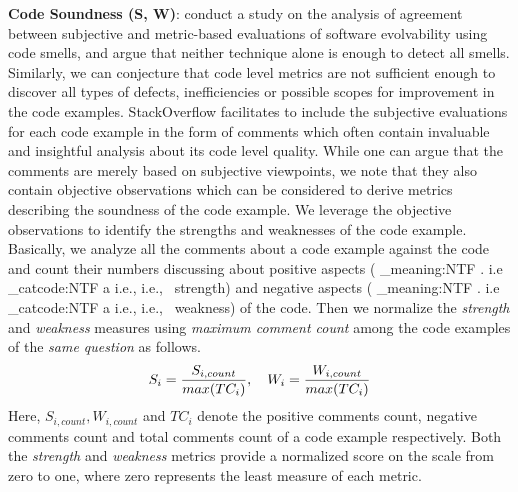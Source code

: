 \documentclass{sig-alternate}
\makeatletter
\newcommand\latinabbrev[1]{
  \peek_meaning:NTF . {%
    #1\@}%
  { \peek_catcode:NTF a {%
      #1., \@ }%
    {#1., \@}}}
\def\ie{\latinabbrev{i.e}}
\makeatother
\begin{document}
\textbf{Code Soundness (S, W)}: \citet{subjective} conduct a study on the analysis of agreement between subjective and metric-based evaluations of software evolvability using code smells, and argue that neither technique alone is enough to detect all smells. Similarly, we can conjecture that code level metrics are not sufficient enough to discover all types of defects, inefficiencies or possible scopes for improvement in the code examples. StackOverflow facilitates to include the subjective evaluations for each code example in the form of comments which often contain invaluable and insightful analysis about its code level quality. While one can argue that the comments are merely based on subjective viewpoints, we note that they also contain objective observations which can be considered to derive metrics describing the soundness of the code example. We leverage the objective observations to identify the strengths and weaknesses of the code example. Basically, we analyze all the comments about a code example against the code and count their numbers discussing about positive aspects (\ie\ strength) and negative aspects (\ie\ weakness) of the code. Then we normalize the \emph{strength} and \emph{weakness} measures using \emph{maximum comment count} among the code examples of the \emph{same question} as follows.
\begin{equation}
\vspace{-.1cm}
S_{i}=\frac{S_{i, count}}{max(TC_{i})},~~~ W_{i}=\frac{W_{i, count}}{max(TC_{i})}
\vspace{-.1cm}
\end{equation}
Here, $S_{i, count}, W_{i, count}$ and $TC_{i}$ denote the positive comments count, negative comments count and total comments count of a code example respectively. Both the \emph{strength} and \emph{weakness} metrics provide a normalized score on the scale from zero to one, where zero represents the least measure of each metric. 
\end{document}
